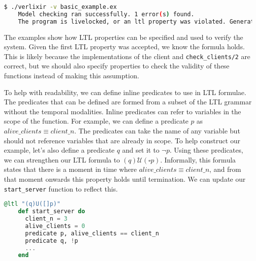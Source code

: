 \begin{lstlisting}[language=bash, xleftmargin=.1\linewidth]
    $ ./verlixir -v basic_example.ex
    Model checking ran successfully. 1 error(s) found.
    The program is livelocked, or an ltl property was violated. Generating trace.
\end{lstlisting}
The examples show how LTL properties can be specified and used to verify the system. Given the first LTL property was accepted, we know the formula holds. This is likely because the implementations of the client and \texttt{check\_clients/2} are correct, but we should also specify properties to check the validity of these functions instead of making this assumption.
\par
To help with readability, we can define inline predicates to use in LTL formulae. The predicates that can be defined are formed from a subset of the LTL grammar without the temporal modalities. Inline predicates can refer to variables in the scope of the function. For example, we can define a predicate \( p \) as $alive\_clients \equiv client\_n$. The predicates can take the name of any variable but should not reference variables that are already in scope. To help construct our example, let's also define a predicate \( q \) and set it to \( \neg p \). Using these predicates, we can strengthen our LTL formula to \( (q) \mathcal{U} (\square p) \). Informally, this formula states that there is a moment in time where $alive\_clients \equiv client\_n$, and from that moment onwards this property holds until termination. We can update our \texttt{start\_server} function to reflect this.
\begin{lstlisting}[language=Elixir, xleftmargin=.3\linewidth]
    @ltl "(q)U([]p)"
    def start_server do
      client_n = 3
      alive_clients = 0
      predicate p, alive_clients == client_n
      predicate q, !p
      ...
    end
\end{lstlisting}
